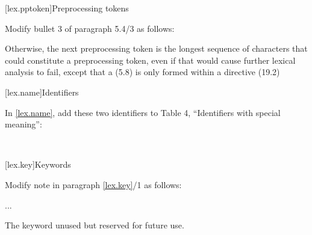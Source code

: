 \begin{after}
\setcounter{section}{3}
[lex.pptoken]{Preprocessing tokens}

Modify bullet 3 of paragraph 5.4/3 as follows:

\begin{std.txt}
Otherwise, the next preprocessing token is
the longest sequence of characters
that could constitute a preprocessing token,
even if that would cause further lexical analysis to fail,
except that a  (5.8)
is only formed
within a  directive (19.2)
\end{std.txt}
\end{after}

\setcounter{section}{9}
[lex.name]{Identifiers}

In \ref{lex.name}, add these two identifiers to Table 4,
``Identifiers with special meaning'':

\begin{std.txt}
\\
\end{std.txt}

\setcounter{section}{10}
[lex.key]{Keywords}

\noindent
Modify note in paragraph \ref{lex.key}/1 as follows:
\begin{std.txt}
    \resetalinea[0]
    \alinea
    ...


    \enternote
    The   keyword 
    unused but   
    reserved for future use.
    \exitnote
\end{std.txt}
